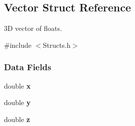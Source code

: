 \hypertarget{structVector}{}\subsection{Vector Struct Reference}
\label{structVector}


3D vector of floats.  




{\ttfamily \#include $<$Structs.\+h$>$}

\subsubsection*{Data Fields}
\begin{DoxyCompactItemize}
\item 
\mbox{\label{structVector_a133722e00601091cb2075219da5da6e4}} 
double {\bfseries x}
\item 
\mbox{\label{structVector_a09a21a140718f234eea348d5058cee0b}} 
double {\bfseries y}
\item 
\mbox{\label{structVector_a1b604d674485316754b72494f5fcc960}} 
double {\bfseries z}
\end{DoxyCompactItemize}
